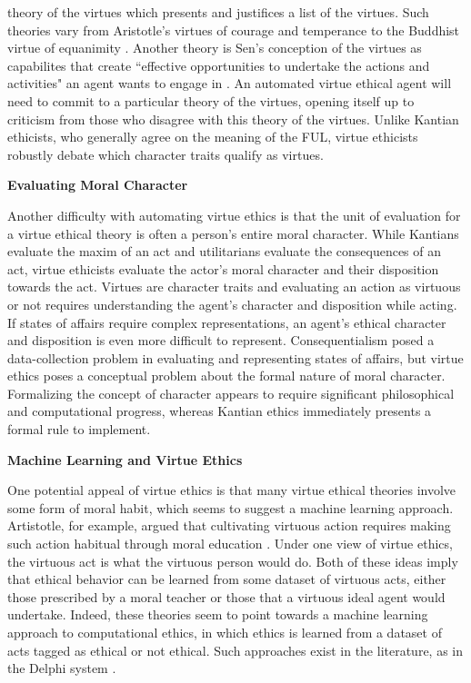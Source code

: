 \begin{isabellebody}
\begin{isamarkuptext}
theory of the virtues which presents and justifices a list of the virtues. Such theories vary
from Aristotle's virtues of courage and temperance to the Buddhist virtue of 
equanimity \cite{aristotle, mcrae}. Another theory is Sen's conception of the virtues as capabilites that create
``effective opportunities to undertake the actions and activities" an agent wants to engage in \cite{robeyns}. 
An automated virtue ethical agent will need to commit to a particular theory of the virtues, opening 
itself up to criticism from those who disagree with this theory of the virtues. Unlike Kantian ethicists, 
who generally agree on the meaning of the FUL, virtue ethicists robustly debate which character traits qualify as virtues.%
\end{isamarkuptext}\isamarkuptrue%
%
\begin{isamarkuptext}%
\textbf{Evaluating Moral Character}%
\end{isamarkuptext}\isamarkuptrue%
%
\begin{isamarkuptext}%
Another difficulty with automating virtue ethics is that the unit of evaluation for a virtue ethical
theory is often a person's entire moral character. While Kantians evaluate the maxim of an act and utilitarians
evaluate the consequences of an act, virtue ethicists evaluate the actor's moral character and their 
disposition towards the act. Virtues are character traits and evaluating an action as virtuous or 
not requires understanding the agent's character and disposition while acting. If states of affairs
require complex representations, an agent's ethical character and disposition is even more difficult
to represent. Consequentialism posed a data-collection problem in evaluating and representing states
of affairs, but virtue ethics poses a conceptual problem about the formal nature of moral character.
Formalizing the concept of character appears to require significant philosophical and computational
progress, whereas Kantian ethics immediately presents a formal rule to implement.%
\end{isamarkuptext}\isamarkuptrue%
%
\begin{isamarkuptext}%
\textbf{Machine Learning and Virtue Ethics}%
\end{isamarkuptext}\isamarkuptrue%
%
\begin{isamarkuptext}%
One potential appeal of virtue ethics is that many virtue ethical theories involve some form of 
moral habit, which seems to suggest a machine learning approach. Artistotle, for example, argued 
that cultivating virtuous action requires making such action habitual through moral education \cite{aristotle}. Under 
one view of virtue ethics, the virtuous act is what the virtuous person would do. Both of these ideas
imply that ethical behavior can be learned from some dataset of virtuous acts, either those 
prescribed by a moral teacher or those that a virtuous ideal agent would undertake. Indeed, these 
theories seem to point towards a machine learning approach to computational ethics, in which ethics is 
learned from a dataset of acts tagged as ethical or not ethical. Such approaches exist in the literature, 
as in the Delphi system \cite{delphi}. 


\end{isamarkuptext}
\end{isabellebody}
